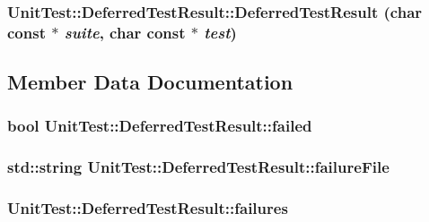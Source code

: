 \hypertarget{struct_unit_test_1_1_deferred_test_result_6b047fe986a44af3b966df4495f62f8f}{
\subsubsection[{DeferredTestResult}]{\setlength{\rightskip}{0pt plus 5cm}UnitTest::DeferredTestResult::DeferredTestResult (char const $\ast$ {\em suite}, \/  char const $\ast$ {\em test})}}
\label{struct_unit_test_1_1_deferred_test_result_6b047fe986a44af3b966df4495f62f8f}




\subsection{Member Data Documentation}
\hypertarget{struct_unit_test_1_1_deferred_test_result_29d12313c586cc950f8a36e0b742124f}{
\subsubsection[{failed}]{\setlength{\rightskip}{0pt plus 5cm}bool {\bf UnitTest::DeferredTestResult::failed}}}
\label{struct_unit_test_1_1_deferred_test_result_29d12313c586cc950f8a36e0b742124f}


\hypertarget{struct_unit_test_1_1_deferred_test_result_191bbff9b19585cee1b87f7e56311da9}{
\subsubsection[{failureFile}]{\setlength{\rightskip}{0pt plus 5cm}std::string {\bf UnitTest::DeferredTestResult::failureFile}}}
\label{struct_unit_test_1_1_deferred_test_result_191bbff9b19585cee1b87f7e56311da9}


\hypertarget{struct_unit_test_1_1_deferred_test_result_39042498a0a8bbba2817cf97978b8c91}{
\subsubsection[{failures}]{ {\bf UnitTest::DeferredTestResult::failures}}}
\label{struct_unit_test_1_1_deferred_test_result_39042498a0a8bbba2817cf97978b8c91}



